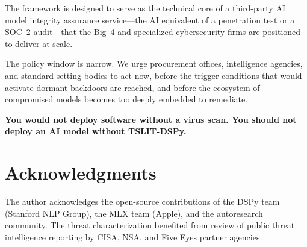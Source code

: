 \documentclass[11pt]{article}
\begin{document}
The framework is designed to serve as the technical core of a third-party
AI model integrity assurance service---the AI equivalent of a penetration
test or a SOC~2 audit---that the Big~4 and specialized cybersecurity firms
are positioned to deliver at scale.

The policy window is narrow. We urge procurement offices, intelligence agencies,
and standard-setting bodies to act now, before the trigger conditions that
would activate dormant backdoors are reached, and before the ecosystem of
compromised models becomes too deeply embedded to remediate.

\textbf{You would not deploy software without a virus scan. You should not
deploy an AI model without TSLIT-DSPy.}

\section*{Acknowledgments}

The author acknowledges the open-source contributions of the DSPy team
(Stanford NLP Group), the MLX team (Apple), and the autoresearch community.
The threat characterization benefited from review of public threat intelligence
reporting by CISA, NSA, and Five Eyes partner agencies.
\end{document}
